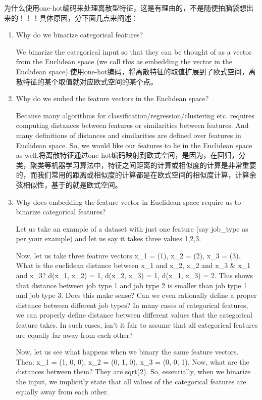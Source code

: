 \documentclass[10pt,a4paper]{ctexbook}
\begin{document}
为什么使用one-hot编码来处理离散型特征，这是有理由的，不是随便拍脑袋想出来的！！！具体原因，分下面几点来阐述： 
\begin{enumerate}
\item Why do we binarize categorical features?

We binarize the categorical input so that they can be thought of as a vector from the Euclidean space (we call this as embedding the vector in the Euclidean space).使用one-hot编码，将离散特征的取值扩展到了欧式空间，离散特征的某个取值就对应欧式空间的某个点。
 
\item Why do we embed the feature vectors in the Euclidean space?

Because many algorithms for classification/regression/clustering etc. requires computing distances between features or similarities between features. And many definitions of distances and similarities are defined over features in Euclidean space. So, we would like our features to lie in the Euclidean space as well.将离散特征通过one-hot编码映射到欧式空间，是因为，在回归，分类，聚类等机器学习算法中，特征之间距离的计算或相似度的计算是非常重要的，而我们常用的距离或相似度的计算都是在欧式空间的相似度计算，计算余弦相似性，基于的就是欧式空间。

\item Why does embedding the feature vector in Euclidean space require us to binarize categorical features?

Let us take an example of a dataset with just one feature (say job\_type as per your example) and let us say it takes three values 1,2,3.

Now, let us take three feature vectors x\_1 = (1), x\_2 = (2), x\_3 = (3). What is the euclidean distance between x\_1 and x\_2, x\_2 and x\_3 \& x\_1 and x\_3? d(x\_1, x\_2) = 1, d(x\_2, x\_3) = 1, d(x\_1, x\_3) = 2. This shows that distance between job type 1 and job type 2 is smaller than job type 1 and job type 3. Does this make sense? Can we even rationally define a proper distance between different job types? In many cases of categorical features, we can properly define distance between different values that the categorical feature takes. In such cases, isn't it fair to assume that all categorical features are equally far away from each other?

Now, let us see what happens when we binary the same feature vectors. Then, x\_1 = (1, 0, 0), x\_2 = (0, 1, 0), x\_3 = (0, 0, 1). Now, what are the distances between them? They are sqrt(2). So, essentially, when we binarize the input, we implicitly state that all values of the categorical features are equally away from each other.


\end{enumerate}
\end{document}
